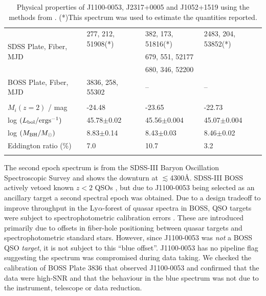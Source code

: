 \documentclass[11pt,a4paper]{article}
\begin{document}
\begin{table}[]
\begin{tabular}{l l l l}
\multirow{3}{*}{SDSS Plate, Fiber, MJD }  &  	277, 212,   51908(*)    &  382, 173, 51816(*)         & 2483, 204, 53852(*) \\
                                                               &                                           & 679, 551, 52177              & \\    
                                                               &                                           & 680, 346, 52200             & \\
      BOSS Plate, Fiber, MJD                 & 	3836, 258, 55302          	    &    --                                & -- \\
      &&\\ 
      $M_{i}(z=2)$  / mag                          &   -24.48                             & -23.65                           & -22.73 \\
      log $(L_{\rm bol} / {\rm erg s}^{-1}) $  &   45.78$\pm$0.02               & 45.56$\pm$0.004      & 45.07$\pm$0.004 \\
      log $(M_{\rm BH} / M_{\odot})  $           &  8.83$\pm$0.14                & 8.43$\pm$0.03           & 8.46$\pm$0.02 \\
      Eddington ratio  (\%)                        &        7.0                         &  10.7                           &  3.2     \\ 
      &&\\
      \hline \hline 
    \end{tabular}
    \caption{Physical properties of J1100-0053, J2317+0005 and J1052+1519 using the methods from 
      \citet{Shen2011}. (*)This spectrum was used to estimate the quantities reported.
} 
    \label{tab:Shen_props}
\end{table}

The second epoch spectrum is from the SDSS-III Baryon Oscillation
Spectroscopic Survey \citep[BOSS; ][]{Dawson2013} and shows the
downturn at $\lesssim$4300\AA. SDSS-III BOSS actively vetoed known
$z<2$ QSOs \citep{Ross2012}, but due to J1100-0053 being selected as
an ancillary target \citep[via a white dwarf program;][]{Kepler2015,
Kepler2016} a second spectral epoch was obtained. Due to a design
tradeoff to improve throughput in the Ly$\alpha$-forest of quasar
spectra in BOSS, QSO targets were subject to spectrophotometric
calibration errors \citep{Margala2016}. These are introduced primarily
due to offsets in fiber-hole positioning between quasar targets and
spectrophotometric standard stars. However, since J1100-0053 was {\it
not} a BOSS QSO {\it target}, it is not subject to this ``blue
offset''. J1100-0053 has no pipeline flag suggesting the spectrum was
compromised during data taking. We checked the calibration of BOSS 
Plate 3836 that observed J1100-0053 and confirmed that the data were
high-SNR and that the behaviour in the blue spectrum was not due to
the instrument, telescope or data reduction.
\end{document}
